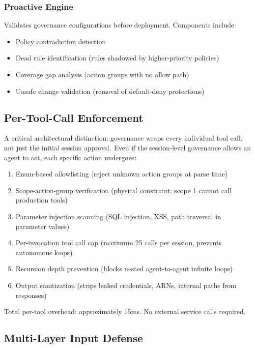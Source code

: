 \documentclass[conference]{IEEEtran}
\begin{document}
\subsubsection{Proactive Engine}

Validates governance configurations before deployment. Components include:

\begin{itemize}
\item Policy contradiction detection
\item Dead rule identification (rules shadowed by higher-priority policies)
\item Coverage gap analysis (action groups with no allow path)
\item Unsafe change validation (removal of default-deny protections)
\end{itemize}

\subsection{Per-Tool-Call Enforcement}

A critical architectural distinction: governance wraps every individual tool call, not just the initial session approval. Even if the session-level governance allows an agent to act, each specific action undergoes:

\begin{enumerate}
\item Enum-based allowlisting (reject unknown action groups at parse time)
\item Scope-action-group verification (physical constraint: scope 1 cannot call production tools)
\item Parameter injection scanning (SQL injection, XSS, path traversal in parameter values)
\item Per-invocation tool call cap (maximum 25 calls per session, prevents autonomous loops)
\item Recursion depth prevention (blocks nested agent-to-agent infinite loops)
\item Output sanitization (strips leaked credentials, ARNs, internal paths from responses)
\end{enumerate}

Total per-tool overhead: approximately 15ms. No external service calls required.

\subsection{Multi-Layer Input Defense}
\end{document}
